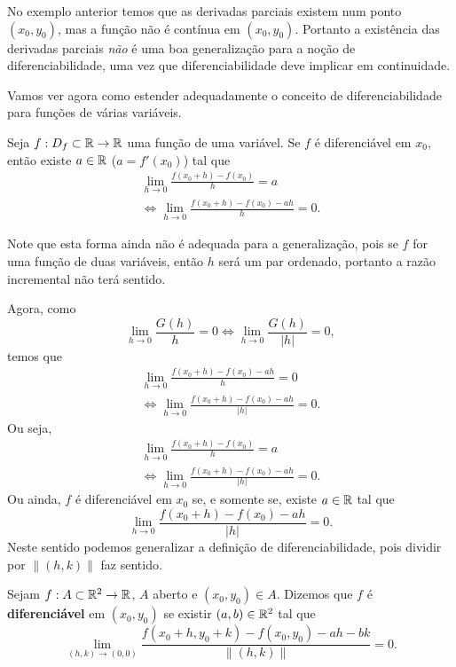 No exemplo anterior temos que as derivadas parciais existem num ponto \((x_0,y_0)\), mas a função não é contínua em \((x_0,y_0)\). Portanto a existência das derivadas parciais \textit{não} é uma boa generalização para a noção de diferenciabilidade, uma vez que diferenciabilidade deve implicar em continuidade.

Vamos ver agora como estender adequadamente o conceito de diferenciabilidade para funções de várias variáveis.

Seja \(f:D_f\subset\mathbb{R} \to \mathbb{R}\) uma função de uma variável. Se \(f\) é diferenciável em \(x_0\), então existe \(a\in\mathbb{R}\) (\(a = f'(x_0)\)) tal que
    \begin{align*}
        \lim_{h\to 0}\frac{f(x_0 + h) - f(x_0)}{h} = a \\ \Leftrightarrow \lim_{h\to 0} \frac{f(x_0+h) - f(x_0) - ah}{h} = 0.
    \end{align*}

Note que esta forma ainda não é adequada para a generalização, pois se \(f\) for uma função de duas variáveis, então \(h\) será um par ordenado, portanto a razão incremental não terá sentido.

Agora, como \[\lim_{h\to 0} \frac{G(h)}{h} = 0 \Leftrightarrow \lim_{h\to 0} \frac{G(h)}{|h|} = 0,\] temos que
    \begin{align*}
        \lim_{h\to 0} \frac{f(x_0 + h) - f(x_0) - ah}{h} = 0 \\ \Leftrightarrow \lim_{h\to 0} \frac{f(x_0+h) - f(x_0) - ah}{|h|} = 0.
    \end{align*}
Ou seja,
    \begin{align*}
        \lim_{h\to 0} \frac{f(x_0 + h) - f(x_0)}{h} = a \\
        \Leftrightarrow \lim_{h\to 0} \frac{f(x_0+h) - f(x_0) - ah}{|h|} = 0.
    \end{align*}
Ou ainda, \(f\) é diferenciável em \(x_0\) se, e somente se, existe \(a\in\mathbb{R}\) tal que \[\lim_{h\to 0} \frac{f(x_0 + h)-f(x_0) - ah}{|h|} = 0.\] Neste sentido podemos generalizar a definição de diferenciabilidade, pois dividir por \(\|(h,k)\|\) faz sentido.

\begin{definition}
    Sejam \(f:A \subset \mathbb{R}^2 \to \mathbb{R}\), \(A\) aberto e \((x_0,y_0)\in A\). Dizemos que \(f\) é \textbf{diferenciável} em \((x_0,y_0)\) se existir \((a,b)\in\mathbb{R}^2\) tal que \[\lim_{(h,k)\to(0,0)} \frac{f(x_0 + h, y_0 + k) - f(x_0,y_0) - ah - bk}{\|(h,k)\|} = 0.\] 
\end{definition}

